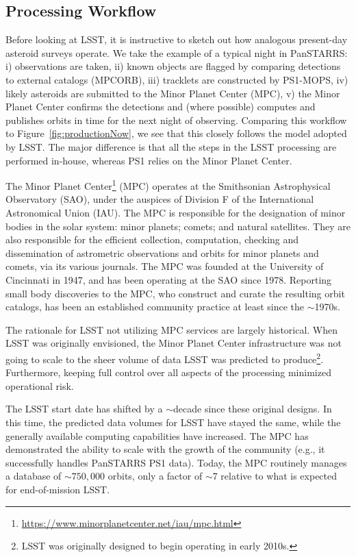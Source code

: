 \documentclass[DM,authoryear,toc,lsstdraft]{lsstdoc}
\begin{document}
\subsection{Processing Workflow\label{sec:promptSSP}}

Before looking at LSST, it is instructive to sketch out how analogous present-day asteroid surveys operate. We take the example of a typical night in PanSTARRS: i) observations are taken, ii) known objects are flagged by comparing detections to external catalogs (MPCORB), iii) tracklets are constructed by PS1-MOPS, iv) likely asteroids are submitted to the Minor Planet Center (MPC), v) the Minor Planet Center confirms the detections and (where possible) computes and publishes orbits in time for the next night of observing.
Comparing this workflow to Figure~\ref{fig:productionNow}, we see that this closely follows the model adopted by LSST. The major difference is that all the steps in the LSST processing are performed in-house, whereas PS1 relies on the Minor Planet Center.

The Minor Planet Center\footnote{\url{https://www.minorplanetcenter.net/iau/mpc.html}} (MPC) operates at the Smithsonian Astrophysical Observatory (SAO), under the auspices of Division F of the International Astronomical Union (IAU). The MPC is responsible for the designation of minor bodies in the solar system: minor planets; comets; and natural satellites. They are also responsible for the efficient collection, computation, checking and dissemination of astrometric observations and orbits for minor planets and comets, via its various journals. The MPC was founded at the University of Cincinnati in 1947, and has been operating at the SAO since 1978. Reporting small body discoveries to the MPC, who construct and curate the resulting orbit catalogs, has been an established community practice at least since the $\sim$1970s.

The rationale for LSST not utilizing MPC services are largely historical. When LSST was originally envisioned, the Minor Planet Center infrastructure was not going to scale to the sheer volume of data LSST was predicted to produce\footnote{LSST was originally designed to begin operating in early 2010s.}. Furthermore, keeping full control over all aspects of the processing minimized operational risk.

The LSST start date has shifted by a $\sim$decade since these original designs. In this time, the predicted data volumes for LSST have stayed the same, while the generally available computing capabilities have increased. The MPC has demonstrated the ability to scale with the growth of the community (e.g., it successfully handles PanSTARRS PS1 data). Today, the MPC routinely manages a database of $\sim 750,000$ orbits, only a factor of $\sim 7$ relative to what is expected for end-of-mission LSST.
\end{document}
